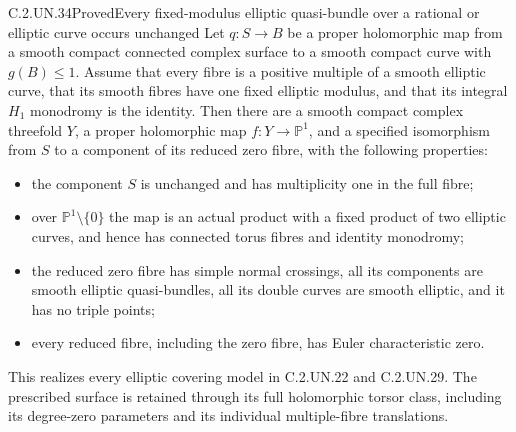 \begin{statement}{C.2.UN.34}{Proved}{Every fixed-modulus elliptic quasi-bundle over a rational or elliptic curve occurs unchanged}
Let $q:S\to B$ be a proper holomorphic map from a
smooth compact connected complex surface to a smooth
compact curve with $g(B)\le1$. Assume that every
fibre is a positive multiple of a smooth elliptic
curve, that its smooth fibres have one fixed elliptic
modulus, and that its integral $H_1$ monodromy is
the identity. Then there are a smooth compact complex
threefold $Y$, a proper holomorphic map
$f:Y\to\mathbb P^1$, and a specified isomorphism
from $S$ to a component of its reduced zero fibre,
with the following properties:

\begin{itemize}
\item the component $S$ is unchanged and has
multiplicity one in the full fibre;
\item over $\mathbb P^1\setminus\{0\}$ the map
is an actual product with a fixed product of two
elliptic curves, and hence has connected torus
fibres and identity monodromy;
\item the reduced zero fibre has simple normal
crossings, all its components are smooth elliptic
quasi-bundles, all its double curves are smooth
elliptic, and it has no triple points;
\item every reduced fibre, including the zero
fibre, has Euler characteristic zero.
\end{itemize}
This realizes every elliptic covering model in
C.2.UN.22 and C.2.UN.29. The prescribed surface
is retained through its full holomorphic torsor
class, including its degree-zero parameters and
its individual multiple-fibre translations.
\end{statement}


